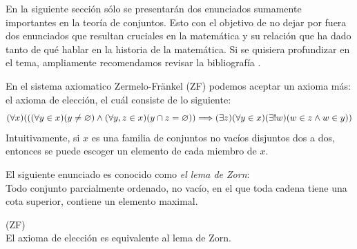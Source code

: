 En la siguiente sección sólo se presentarán dos enunciados sumamente importantes en la teoría de conjuntos. Esto con el objetivo de no dejar por fuera dos enunciados que resultan cruciales en la matemática y su relación que ha dado tanto de qué hablar en la historia de la matemática.
Si se quisiera profundizar en el tema, ampliamente recomendamos revisar la bibliografía {\cite[Capítulo 9]{SetTheory}}.
\begin{defn}
    En el sistema axiomatico Zermelo-Fränkel (ZF) podemos aceptar un axioma más: el axioma de elección, el cuál consiste de lo siguiente:
    \[(\forall x)(((\forall y\in x)(y\neq\varnothing)\land(\forall y,z\in x)(y\cap z=\varnothing))\Longrightarrow(\exists z)(\forall y\in x)(\exists!w)(w\in z\land w\in y))\]
    Intuitivamente, si $x$ es una familia de conjuntos no vacíos disjuntos dos a dos, entonces se puede escoger un elemento de cada miembro de $x$.
\end{defn}
\begin{defn}
    El siguiente enunciado es conocido como \textit{el lema de Zorn}:\\
    Todo conjunto parcialmente ordenado, no vacío, en el que toda cadena tiene una cota superior, contiene un elemento maximal.
\end{defn}
\begin{thm} (ZF)\\
    El axioma de elección es equivalente al lema de Zorn.
\end{thm}
